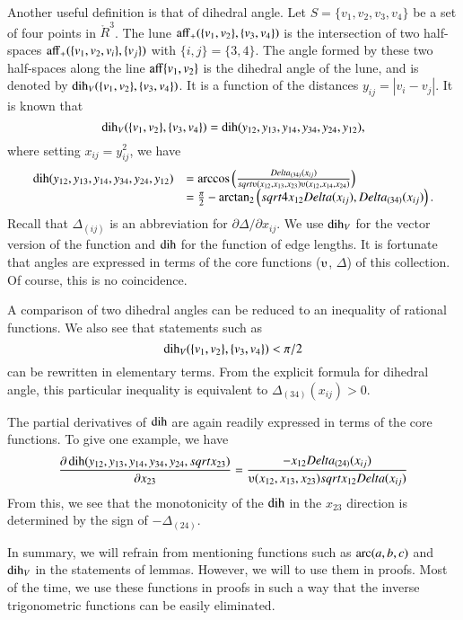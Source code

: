 \begin{tarskidata}
Another useful definition is that of dihedral angle.  Let 
$S=\{v_1,v_2,v_3,v_4\}$ be a set of four points in $\ring{R}^3$.
The lune ${\operatorname{aff}}_+(\{v_1,v_2\},\{v_3,v_4\})$ is the intersection
of two half-spaces ${\operatorname{aff}}_+(\{v_1,v_2,v_i\},\{v_j\})$ with
$\{i,j\}=\{3,4\}$.  The angle formed by these two half-spaces along
the line ${\operatorname{aff}}\{v_1,v_2\}$ is the dihedral angle of the lune,
and is denoted by $\operatorname{dih}_V(\{v_1,v_2\},\{v_3,v_4\})$.  It is a function
of the distances $y_{ij} = |v_i-v_j|$.  It is known that
 $$
 \operatorname{dih}_V(\{v_1,v_2\},\{v_3,v_4\}) = 
  \operatorname{dih}(y_{12},y_{13},y_{14},y_{34},y_{24},y_{12}),
 $$
where setting $x_{ij}=y_{ij}^2$, we have
 $$\begin{array}{lll}
  \dih(y_{12},y_{13},y_{14},y_{34},y_{24},y_{12}) &=
  \arccos\left(\frac{\Delta_{(34)}(x_{ij})}{\sqrt{
    \ups(x_{12},x_{13},x_{23})\ups(x_{12},x_{14},x_{24})}}\right)\\
    &=\frac{\pi}{2} - \atn
     \left({\sqrt{4 x_{12} \Delta(x_{ij})}},{\Delta_{(34)}(x_{ij})}\right).
  \end{array} 
 $$
Recall that $\Delta_{(ij)}$ is an abbreviation for 
$\partial\Delta/\partial x_{ij}$.  We use $\operatorname{dih}_V$ for the
vector version of the function and $\operatorname{dih}$ for the function of
edge lengths.
It is fortunate that angles are expressed in terms of the 
core functions ($\ups$, $\Delta$) of this collection.  Of course,
this is no coincidence.


A comparison of two dihedral angles can be reduced to an inequality
of rational functions. We also see that statements such as
  $$
  \operatorname{dih}_V(\{v_1,v_2\},\{v_3,v_4\}) < \pi/2
  $$
can be rewritten in elementary terms.  From the explicit formula
for dihedral angle, this particular inequality
is equivalent to $\Delta_{(34)}(x_{ij}) > 0$.

The partial derivatives of $\operatorname{dih}$ are again readily expressed in
terms of the core functions.
To give one example, we have
  $$
  \frac{\partial\dih(y_{12},y_{13},y_{14},y_{34},y_{24},\sqrt{x_{23}})}
  {\partial x_{23}} = 
  \frac{ -x_{12} \Delta_{(24)}(x_{ij})} {\ups(x_{12},x_{13},x_{23})
   \sqrt{x_{12}\Delta(x_{ij})}}
  $$
From this, we see that the monotonicity of the $\operatorname{dih}$
in the $x_{23}$ direction is determined by the sign of
$-\Delta_{(24)}$.




In summary, we will refrain from mentioning functions such as
$\operatorname{arc}(a,b,c)$ and $\operatorname{dih}_V$ in the statements of lemmas.  However,
we will to use them in proofs.  Most of the time, we use
these functions in proofs in such a way that the inverse
trigonometric functions
can be easily eliminated.




\end{tarskidata}
